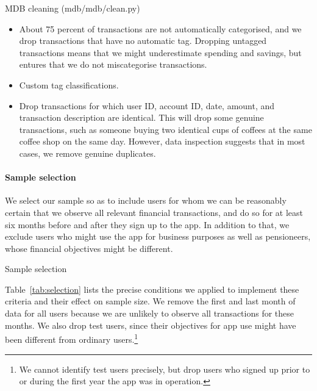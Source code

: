 MDB cleaning (mdb/mdb/clean.py)
\begin{itemize}
    \item About 75 percent of transactions are not automatically categorised,
        and we drop transactions that have no automatic tag. Dropping untagged
        transactions means that we might underestimate spending and savings,
        but entures that we do not miscategorise transactions.

    \item Custom tag classifications.

    \item Drop transactions for which user ID, account ID, date, amount, and
        transaction description are identical. This will drop some genuine
        transactions, such as someone buying two identical cups of coffees at
        the same coffee shop on the same day. However, data inspection suggests
        that in most cases, we remove genuine duplicates.
\end{itemize}


\paragraph{Sample selection}%
\label{par:sample_selection}

We select our sample so as to include users for whom we can be reasonably
certain that we observe all relevant financial transactions, and do so for at
least six months before and after they sign up to the app. In addition to that,
we exclude users who might use the app for business purposes as well as
pensioneers, whose financial objectives might be different.

\begin{table}
\centering
\caption{Sample selection}\label{tab:selection}

\end{table}


Table~\ref{tab:selection} lists the precise conditions we applied to implement
these criteria and their effect on sample size. We remove the first and last
month of data for all users because we are unlikely to observe all transactions
for these months. We also drop test users, since their objectives for app use
might have been different from ordinary users.\footnote{We cannot identify test
users precisely, but drop users who signed up prior to or during the first year
the app was in operation.}

